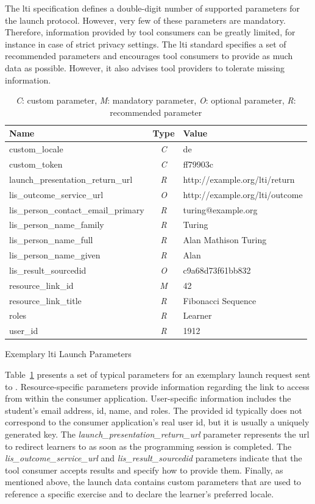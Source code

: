 The \gls{lti} specification defines a double-digit number of supported parameters for the launch protocol. However, very few of these parameters are mandatory. Therefore, information provided by tool consumers can be greatly limited, for instance in case of strict privacy settings. The \gls{lti} standard specifies a set of recommended parameters and encourages tool consumers to provide as much data as possible. However, it also advises tool providers to tolerate missing information.

\begin{table}
\begin{tabular}{ l | c | l }
Name & Type & Value \\
\hline
custom\_locale & \emph{C} & de \\
custom\_token & \emph{C} & ff79903c \\
launch\_presentation\_return\_url & \emph{R} & http://example.org/lti/return \\
lis\_outcome\_service\_url & \emph{O} & http://example.org/lti/outcome \\
lis\_person\_contact\_email\_primary & \emph{R} & turing@example.org \\
lis\_person\_name\_family & \emph{R} & Turing \\
lis\_person\_name\_full & \emph{R} & Alan Mathison Turing \\
lis\_person\_name\_given & \emph{R} & Alan \\
lis\_result\_sourcedid & \emph{O} & c9a68d73f61bb832 \\
resource\_link\_id & \emph{M} & 42 \\
resource\_link\_title & \emph{R} & Fibonacci Sequence \\
roles & \emph{R} & Learner \\
user\_id & \emph{R} & 1912 \\
\end{tabular}
\caption{Exemplary \gls{lti} Launch Parameters}
\caption*{\emph{C}: custom parameter, \emph{M}: mandatory parameter, \emph{O}: optional parameter, \emph{R}: recommended parameter}
\label{table:lti-launch-parameters}
\end{table}

Table~\ref{table:lti-launch-parameters} presents a set of typical parameters for an exemplary launch request sent to \tool. Resource-specific parameters provide information regarding the link to access \tool from within the consumer application. User-specific information includes the student's email address, \gls{id}, name, and roles. The provided \gls{id} typically does not correspond to the consumer application's real user \gls{id}, but it is usually a uniquely generated key. The \emph{launch\_presentation\_return\_url} parameter represents the \gls{url} to redirect learners to as soon as the programming session is completed. The \emph{lis\_outcome\_service\_url} and \emph{lis\_result\_sourcedid} parameters indicate that the tool consumer accepts results and specify how to provide them. Finally, as mentioned above, the launch data contains custom parameters that are used to reference a specific exercise and to declare the learner's preferred locale.

